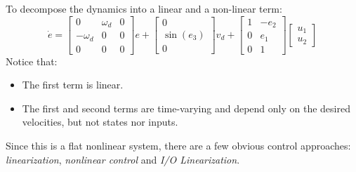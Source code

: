 To decompose the dynamics into a linear and a non-linear term:
\begin{equation}\label{uni_traj_dec_error}
    \dot{e}=
    \begin{bmatrix}
        0 & \omega_d & 0 \\
        -\omega_d & 0 & 0 \\
        0 & 0 & 0
    \end{bmatrix}
    e+
    \begin{bmatrix}
        0 \\ \sin(e_3) \\ 0
    \end{bmatrix} v_d +
    \begin{bmatrix}
        1 & -e_2 \\
        0 & e_1 \\
        0 & 1
    \end{bmatrix}
    \begin{bmatrix}
        u_1 \\ u_2
    \end{bmatrix}
\end{equation}
Notice that:
\begin{itemize}
    \item The first term is linear.
    \item The first and second terms are time-varying and depend only on the desired velocities, but not states nor inputs.
\end{itemize}
Since this is a flat nonlinear system, there are a few obvious control approaches: \textit{linearization}, \textit{nonlinear control} and \textit{I/O Linearization}.
